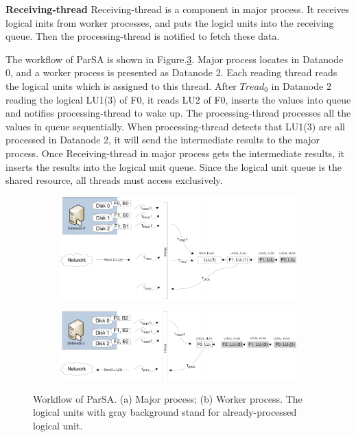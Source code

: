 \documentclass[preprint,12pt]{elsarticle}
\begin{document}
\textbf{Receiving-thread} Receiving-thread is a component in major process. It receives logical inits from worker processes, and
puts the logicl units into the receiving queue. Then the processing-thread is notified to fetch these data. \par
The workflow of ParSA is shown in Figure.\ref{figure6}. Major process locates in Datanode 0, and a worker process is presented as 
Datanode 2. Each reading thread reads the logical units which is assigned to this thread. After $Tread_0$ in Datanode 2 reading the 
logical LU1(3) of F0, it reads LU2 of F0, inserts the values into queue and notifies processing-thread to wake up. The processing-thread 
processes all the values in queue sequentially. When processing-thread detects that LU1(3) are all processed in Datanode 2, it will 
send the intermediate results to the major process. Once Receiving-thread in major process gets the intermediate results, it inserts the results into the logical unit queue. Since the logical unit queue is the shared resource, all threads must access exclusively. \par

\begin{figure}[htb]
    \centering
    \begin{subfigure}{1\textwidth}
        \includegraphics[width=\textwidth]{figure6a}
        \caption{}
        \label{figure6a}
    \end{subfigure}

    \begin{subfigure}{\textwidth}
        \centering
        \includegraphics[width=1\textwidth]{figure6b}%
        \caption{}
        \label{figure6b}
    \end{subfigure}
    \caption{Workflow of ParSA. (a) Major process; (b) Worker process. The logical units with gray background stand for already-processed
             logical unit.}
    \label{figure6}
\end{figure}
\end{document}

